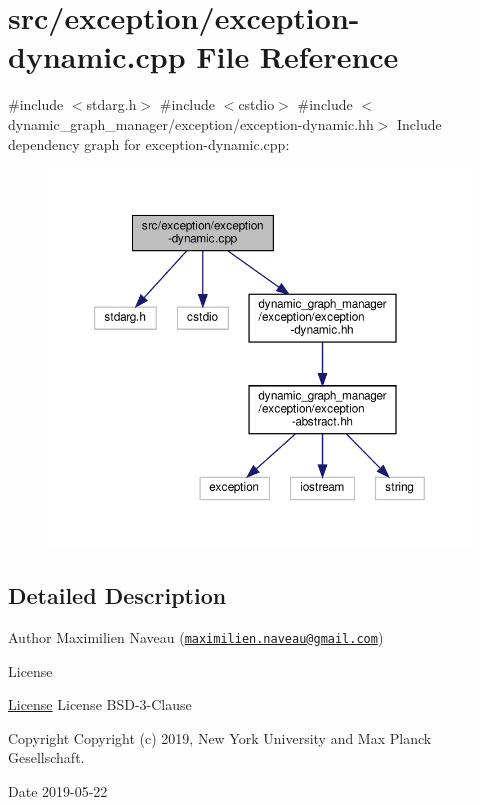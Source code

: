 \hypertarget{exception-dynamic_8cpp}{}\section{src/exception/exception-\/dynamic.cpp File Reference}
\label{exception-dynamic_8cpp}
{\ttfamily \#include $<$stdarg.\+h$>$}\newline
{\ttfamily \#include $<$cstdio$>$}\newline
{\ttfamily \#include $<$dynamic\+\_\+graph\+\_\+manager/exception/exception-\/dynamic.\+hh$>$}\newline
Include dependency graph for exception-\/dynamic.cpp\+:
\nopagebreak
\begin{figure}[H]
\begin{center}
\leavevmode
\includegraphics[width=350pt]{exception-dynamic_8cpp__incl}
\end{center}
\end{figure}


\subsection{Detailed Description}
\begin{DoxyAuthor}{Author}
Maximilien Naveau (\href{mailto:maximilien.naveau@gmail.com}{\tt maximilien.\+naveau@gmail.\+com}) 
\end{DoxyAuthor}
\begin{DoxyRefDesc}{License}
\item[\hyperlink{license__license000045}{License}]License B\+S\+D-\/3-\/\+Clause \end{DoxyRefDesc}
\begin{DoxyCopyright}{Copyright}
Copyright (c) 2019, New York University and Max Planck Gesellschaft. 
\end{DoxyCopyright}
\begin{DoxyDate}{Date}
2019-\/05-\/22 
\end{DoxyDate}
